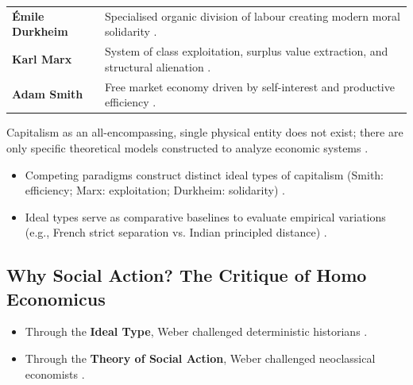 \begin{table}[htbp]
\centering
\begin{tabularx}{\textwidth}{p{3.5cm} Y}
\hline
{}
 &  \\
\hline
\textbf{\'Emile Durkheim} & Specialised organic division of labour creating modern moral solidarity . \\
\textbf{Karl Marx} & System of class exploitation, surplus value extraction, and structural alienation . \\
\textbf{Adam Smith} & Free market economy driven by self-interest and productive efficiency . \\
\hline
\end{tabularx}
\end{table}

\begin{KeyConcept}
Capitalism as an all-encompassing, single physical entity does not exist; there are only specific theoretical models constructed to analyze economic systems .
\end{KeyConcept}

\begin{QuickRevision}
\begin{itemize}
    \item Competing paradigms construct distinct ideal types of capitalism (Smith: efficiency; Marx: exploitation; Durkheim: solidarity) .
    \item Ideal types serve as comparative baselines to evaluate empirical variations (e.g., French strict separation vs. Indian principled distance) .
\end{itemize}
\end{QuickRevision}

\subsection{Why Social Action? The Critique of Homo Economicus}

\begin{KeyConcept}
\begin{itemize}
    \item Through the \textbf{Ideal Type}, Weber challenged deterministic historians .
    \item Through the \textbf{Theory of Social Action}, Weber challenged neoclassical economists .
\end{itemize}
\end{KeyConcept}

